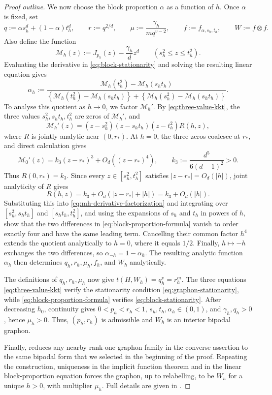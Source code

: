 \begin{proof}[Proof outline]
We now choose the block proportion $\alpha$ as a function of $h$.
Once $\alpha$ is fixed, set
\[
  q:=\alpha s_h^d+(1-\alpha)t_h^d,
  \qquad
  r:=q^{2/d},
  \qquad
  \mu:=\frac{\gamma_h}{m q^{v-2}},
  \qquad
  f:=f_{\alpha,s_h,t_h},
  \qquad
  W:=f\otimes f.
\]
Also define the function
\[
  \mathcal M_h(z):=J_{p_h}(z)-\frac{\gamma_h}{d}z^d
  \qquad (s_h^2 \le z \le t_h^2).
\]
Evaluating the derivative in \eqref{eq:block-stationarity} and
solving the resulting linear equation gives
\begin{equation}\label{eq:block-proportion-formula}
  \alpha_h:=
  \frac{\mathcal M_h(t_h^2)-\mathcal M_h(s_ht_h)}
  {\left\{\mathcal M_h(t_h^2)-\mathcal M_h(s_ht_h)\right\}+
  \left\{\mathcal M_h(s_h^2)-\mathcal M_h(s_ht_h)\right\}}.
\end{equation}
To analyse this quotient as $h\to0$, we factor $\mathcal M_h'$.  By
\eqref{eq:three-value-kkt}, the three values
$s_h^2,s_ht_h,t_h^2$ are zeros of $\mathcal M_h'$, and
\begin{equation}\label{eq:mh-derivative-factorization}
  \mathcal M_h'(z)
  =(z-s_h^2)(z-s_ht_h)(z-t_h^2)R(h,z),
\end{equation}
where $R$ is jointly analytic near $(0,r_*)$.
At $h=0$, the three zeros coalesce at $r_*$, and direct calculation gives
\[
  \mathcal M_0'(z)
  =k_3(z-r_*)^3+O_d((z-r_*)^4),
  \qquad
  k_3:=\frac{d^5}{6(d-1)^2}>0.
\]
Thus $R(0,r_*)=k_3$.  Since every $z\in[s_h^2,t_h^2]$ satisfies
$|z-r_*|=O_d(|h|)$, joint analyticity of $R$ gives
\[
  R(h,z)=k_3+O_d(|z-r_*|+|h|)=k_3+O_d(|h|).
\]
Substituting this into \eqref{eq:mh-derivative-factorization}
and integrating over $[s_h^2,s_ht_h]$ and $[s_ht_h,t_h^2]$,
and using the expansions of $s_h$ and $t_h$ in powers of $h$,
show that the two differences in \eqref{eq:block-proportion-formula} vanish to order exactly four
and have the same leading term.  Cancelling their common factor $h^4$ extends
the quotient analytically to $h=0$, where it equals $1/2$.  Finally,
$h\mapsto-h$ exchanges the two differences, so
$\alpha_{-h}=1-\alpha_h$.  The resulting analytic function $\alpha_h$ then
determines $q_h,r_h,\mu_h,f_h$, and $W_h$ analytically.

The definitions of $q_h,r_h,\mu_h$ now give
$t(H,W_h)=q_h^v=r_h^m$.  The three equations
\eqref{eq:three-value-kkt} verify the stationarity condition
\eqref{eq:graphon-stationarity}, while
\eqref{eq:block-proportion-formula} verifies
\eqref{eq:block-stationarity}.
After decreasing $h_0$, continuity gives $0<p_h<r_h<1$,
$s_h,t_h,\alpha_h\in(0,1)$, and $\gamma_h,q_h>0$, hence $\mu_h>0$.
Thus, $(p_h,r_h)$ is admissible and $W_h$ is an interior bipodal graphon.

Finally,  reduces any nearby rank-one graphon family in the
converse assertion to the same bipodal form that we selected in the beginning of the proof.
Repeating the construction, uniqueness in the implicit function theorem and in the linear
block-proportion equation forces the graphon, up to relabelling, to be
$W_h$ for a unique $h>0$, with multiplier $\mu_h$.
Full details are given in
.
\end{proof}

